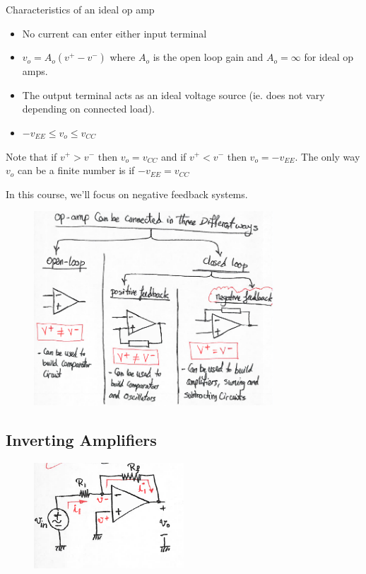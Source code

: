 \documentclass[12pt]{article}
\begin{document}
Characteristics of an ideal op amp
\begin{itemize}
\item No current can enter either input terminal
\item $v_o = A_o(v^+ - v^-)$ where $A_o$ is the open loop gain and $A_o = \infty$ for ideal op amps.
\item The output terminal acts as an ideal voltage source (ie. does not vary depending on connected load).
\item $-v_{EE} \leq v_o \leq v_{CC}$
\end{itemize}

Note that if $v^+ > v^-$ then $v_o = v_{CC}$ and if $v^+ < v^-$ then $v_o = -v_{EE}$. The only way $v_o$ can be a finite number is if $-v_{EE} = v_{CC}$

In this course, we'll focus on negative feedback systems.

\begin{figure}[ht]
\centering
\includegraphics[width=0.8\textwidth]{opampforms.png}
\end{figure}

\subsection*{Inverting Amplifiers}

\begin{figure}[ht]
\centering
\includegraphics[width=0.5\textwidth]{invertingamp.png}
\end{figure}
\end{document}
